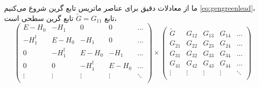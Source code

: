 ما از معادلات دقیق برای عناصر ماتریس تابع گرین شروع می‌کنیم \ref{eq:gengreenlead}، تابع $\tilde{G}={{G}_{11}}$ تابع گرین سطحی است،
\begin{equation}
    \left( \begin{matrix}
           E-{{H}_{0}} & -{{H}_{1}} & 0 & 0 & \ldots   \\
           -H_{1}^{\dagger } & E-{{H}_{0}} & -{{H}_{1}} & 0 & \ldots   \\
           0 & -H_{1}^{\dagger } & E-{{H}_{0}} & -{{H}_{1}} & \ldots   \\
           0 & 0 & -H_{1}^{\dagger } & E-{{H}_{0}} & \ldots   \\
           \vdots  & \vdots  & \vdots  & \vdots  & \ddots   \\
        \end{matrix} \right)\times \left( \begin{matrix}
           {\tilde{G}} & {{G}_{12}} & {{G}_{13}} & {{G}_{14}} & \ldots   \\
           {{G}_{21}} & {{G}_{22}} & {{G}_{23}} & {{G}_{24}} & \ldots   \\
           {{G}_{31}} & {{G}_{32}} & {{G}_{33}} & {{G}_{34}} & \ldots   \\
           {{G}_{41}} & {{G}_{42}} & {{G}_{43}} & {{G}_{44}} & \ldots   \\
           \vdots  & \vdots  & \vdots  & \vdots  & \ddots   \\
        \end{matrix} \right)
\end{equation}

